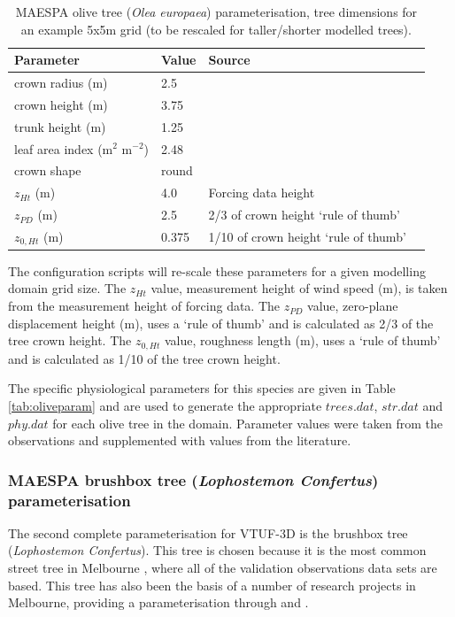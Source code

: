 \documentclass[preprint,12pt,authoryear]{elsarticle}
\begin{document}
\begin{center}
\begin{table}[!htbp]
\caption{MAESPA olive tree (\textit{Olea europaea}) parameterisation, tree dimensions for an example 5x5m grid (to be rescaled for taller/shorter modelled trees).\label{tab:olivescaled}}
\begin{tabular}{ |  l | l | l | l |}
\hline \textbf{Parameter} & \textbf{Value} & \textbf{Source} \\ 
\hline
crown radius (m) & 2.5 & \cite{Coutts2014a}\\ \hline
crown height (m) & 3.75 & \cite{Coutts2014a}\\ \hline
trunk height (m) & 1.25 & \cite{Coutts2014a}\\ \hline
leaf area index (m$^{2}$ m$^{-2}$)&2.48 &\cite{Mariscal2000}\\ \hline
crown shape & round &\\ \hline
$z_{Ht}$ (m)&4.0&Forcing data height \\ \hline
$z_{PD}$ (m) &2.5& 2/3 of crown height `rule of thumb' \citep{Grimmond1999}\\ \hline
$z_{0,Ht}$ (m) &0.375& 1/10 of crown height `rule of thumb' \citep{Grimmond1999} \\ \hline
\end{tabular} 
\end{table}
\end{center}



The configuration scripts will re-scale these parameters for a given modelling domain grid size. The $z_{Ht}$ value, measurement height of wind speed (m), is taken from the measurement height of forcing data. The $z_{PD}$ value, zero-plane displacement height (m), uses a `rule of thumb' and is calculated as 2/3 of the tree crown height.  The $z_{0,Ht}$ value, roughness length (m), uses a `rule of thumb' and is calculated as 1/10 of the tree crown height.

The specific physiological parameters for this species are given in Table \ref{tab:oliveparam} and are used to generate the appropriate $trees.dat$, $str.dat$ and $phy.dat$ for each olive tree in the domain.  Parameter values were taken from the \cite{Coutts2014a} observations and supplemented with values from the literature.


\subsubsection{MAESPA brushbox tree (\textit{Lophostemon Confertus}) parameterisation}
The second complete parameterisation for VTUF-3D is the  brushbox tree (\textit{Lophostemon Confertus}). This tree is chosen because it is the most common street tree in Melbourne \citep{Frank2006}, where all of the validation observations data sets are based. This tree has also been the basis of a number of research projects in Melbourne, providing a parameterisation through \cite{Coutts2016} and \cite{Coutts2015ICUC}.
\end{document}
